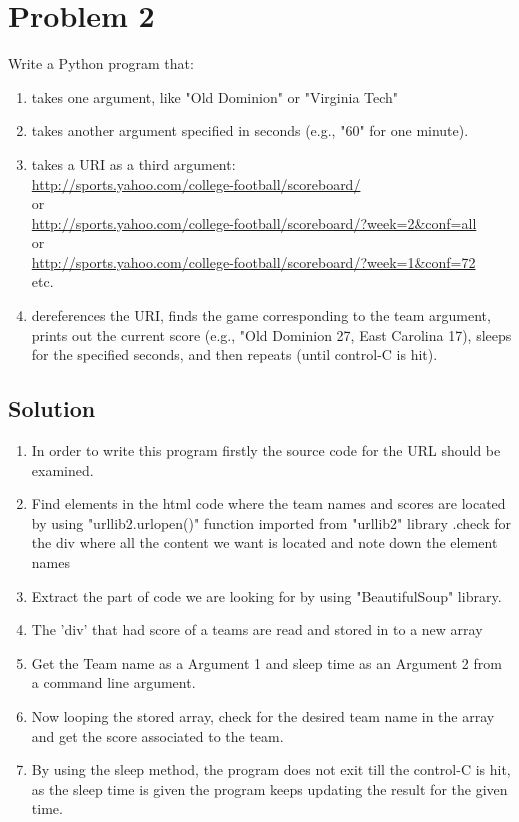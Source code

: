 
\section{Problem 2}
\label{part2}
Write a Python program that:
\begin{enumerate} 
\item takes one argument, like "Old Dominion" or "Virginia Tech" 
\item takes another argument specified in seconds (e.g., "60" for one minute).
\item takes a URI as a third argument:\\
\url{http://sports.yahoo.com/college-football/scoreboard/}\\
or\\
\url{http://sports.yahoo.com/college-football/scoreboard/?week=2\&conf=all}\\
or\\
\url{ http://sports.yahoo.com/college-football/scoreboard/?week=1\&conf=72}\\
etc.\\
\item dereferences the URI, finds the game corresponding to the team
     argument, prints out the current score (e.g., "Old Dominion 27, 
     East Carolina 17), sleeps for the specified seconds, and then
     repeats (until control-C is hit).
\end{enumerate}

\subsection{Solution}
\begin{enumerate}
\item In order to write this program firstly the source code for the URL should be examined.
\item Find elements in the html code where the team names and scores are located by using "urllib2.urlopen()" function imported from "urllib2" library .check for the div where all the content we want is located and note down the element names
\item Extract the part of code we are looking for by using "BeautifulSoup" library. 
\item The 'div' that had score of a teams are read and stored in to a new array 
\item Get the Team name as a Argument 1 and sleep time as an Argument 2 from a command line argument.
\item Now looping the stored array, check for the desired team name in the array and get the score associated to the team. 
\item By using the sleep method, the program does not exit till the control-C is hit, as the sleep time is given the program keeps updating the result for the given time.
\end{enumerate}

